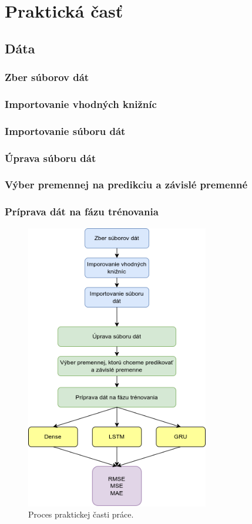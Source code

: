 \section{Praktická časť}

\subsection{Dáta}


\subsubsection{Zber súborov dát}
\subsubsection{Importovanie vhodných knižníc}
\subsubsection{Importovanie súboru dát}

\subsubsection{Úprava súboru dát}
\subsubsection{Výber premennej na predikciu a závislé premenné}
\subsubsection{Príprava dát na fázu trénovania}


\begin{figure}[!htbp]
  \centering
  \includegraphics[width=8cm]{img/workflow.png}
  \caption{Proces praktickej časti práce.}
  \label{workflow}
\end{figure}


